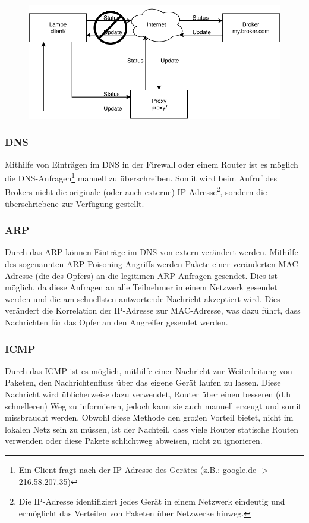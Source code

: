         \begin{figure}[h]%
            \centering
            \includegraphics[width=14cm]{tex/bilder/2_grundlagen/Szenario1_MitM.pdf}
            \label{fig:szenario-mitm}
        \end{figure}
        
        \subsubsection{DNS}
        Mithilfe von Einträgen im \ac{DNS} in der Firewall oder einem Router ist es möglich die \ac{DNS}-Anfragen\footnote{Ein Client fragt nach der \acs{IP}-Adresse des Gerätes (z.B.: google.de -> 216.58.207.35)} manuell zu überschreiben. Somit wird beim Aufruf des Brokers nicht die originale (oder auch externe) IP-Adresse\footnote{Die \acs{IP}-Adresse identifiziert jedes Gerät in einem Netzwerk eindeutig und ermöglicht das Verteilen von Paketen über Netzwerke hinweg.}, sondern die überschriebene zur Verfügung gestellt.
        \subsubsection{ARP}
        Durch das \ac{ARP} können Einträge im \ac{DNS} von extern verändert werden. Mithilfe des sogenannten \acs{ARP}-Poisoning-Angriffs werden Pakete einer veränderten \ac{MAC}-Adresse (die des Opfers) an die legitimen \ac{ARP}-Anfragen gesendet. Dies ist möglich, da diese Anfragen an alle Teilnehmer in einem Netzwerk gesendet werden und die am schnellsten antwortende Nachricht akzeptiert wird. Dies verändert die Korrelation der \acs{IP}-Adresse zur \acs{MAC}-Adresse, was dazu führt, dass Nachrichten für das Opfer an den Angreifer gesendet werden. \cite{4768661}
        \subsubsection{ICMP}
        Durch das \ac{ICMP} ist es möglich, mithilfe einer Nachricht zur Weiterleitung von Paketen, den Nachrichtenfluss über das eigene Gerät laufen zu lassen.
        Diese Nachricht wird üblicherweise dazu verwendet, Router über einen besseren (d.h schnelleren) Weg zu informieren, jedoch kann sie auch manuell erzeugt und somit missbraucht werden. Obwohl diese Methode den großen Vorteil bietet, nicht im lokalen Netz sein zu müssen, ist der Nachteil, dass viele Router statische Routen verwenden oder diese Pakete schlichtweg abweisen, nicht zu ignorieren.
